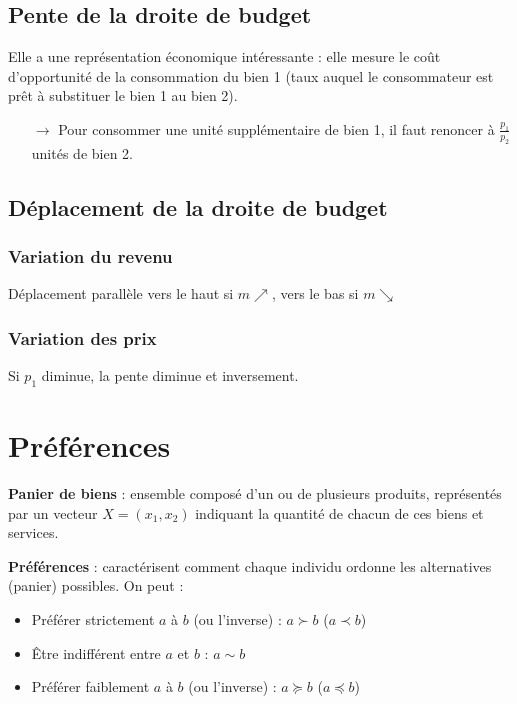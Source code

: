 \subsection{Pente de la droite de budget}

Elle a une représentation économique intéressante : elle mesure le coût d’opportunité de la consommation du bien 1 (taux auquel le consommateur est prêt à substituer le bien 1 au bien 2).
\begin{itemize}
\item[$\rightarrow$] Pour consommer une unité supplémentaire de bien 1, il faut renoncer à $\frac{p_1}{p_2}$ unités de bien 2.
\end{itemize}

\subsection{Déplacement de la droite de budget}

\subsubsection{Variation du revenu}
Déplacement parallèle vers le haut si $m \nearrow$, vers le bas si $m \searrow$

\subsubsection{Variation des prix}
Si $p_1$ diminue, la pente diminue et inversement.

\section{Préférences}

\textbf{Panier de biens} : ensemble composé d'un ou de plusieurs produits, représentés par un vecteur $X = (x_1, x_2)$ indiquant la quantité de chacun de ces biens et services.

\textbf{Préférences} : caractérisent comment chaque individu ordonne les alternatives (panier) possibles.
On peut :
\begin{itemize}
\item Préférer strictement $a$ à $b$ (ou l'inverse) : $a \succ b$ ($a \prec b$)
\item Être indifférent entre $a$ et $b$ : $a \sim b$
\item Préférer faiblement $a$ à $b$ (ou l'inverse) : $a \succeq b$ ($a \preceq b$)
\end{itemize}


